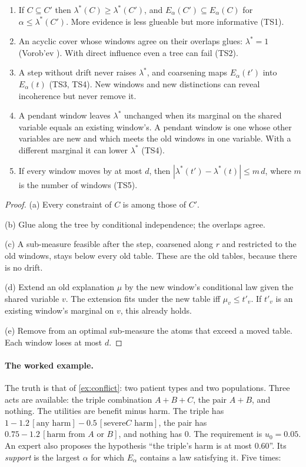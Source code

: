 \documentclass[11pt]{article}
\theoremstyle{definition}\newtheorem{definition}[theorem]{Definition}\newtheorem{remark}[theorem]{Remark}\newtheorem{example}[theorem]{Example}
\begin{document}
\begin{proposition}\label{prop:timesheaf}
\begin{enumerate}
\item[(a)] If $C\subseteq C'$ then $\lambda^*(C)\ge\lambda^*(C')$, and $E_\alpha(C')\subseteq E_\alpha(C)$ for $\alpha\le\lambda^*(C')$. More
  evidence is less glueable but more informative (TS1).
\item[(b)] An acyclic cover whose windows agree on their overlaps glues: $\lambda^*=1$ (Vorob'ev \cite{Vorobev1962}). With direct
  influence even a tree can fail (TS2).
\item[(c)] A step without drift never raises $\lambda^*$, and coarsening maps $E_\alpha(t')$ into $E_\alpha(t)$ (TS3, TS4). New windows and
  new distinctions can reveal incoherence but never remove it.
\item[(d)] A pendant window leaves $\lambda^*$ unchanged when its marginal on the shared variable equals an existing window's. A pendant
  window is one whose other variables are new and which meets the old windows in one variable. With a different marginal it can lower
  $\lambda^*$ (TS4).
\item[(e)] If every window moves by at most $d$, then $|\lambda^*(t')-\lambda^*(t)|\le m\,d$, where $m$ is the number of windows (TS5).
\end{enumerate}
\end{proposition}

\begin{proof}
(a) Every constraint of $C$ is among those of $C'$.

(b) Glue along the tree by conditional independence; the overlaps agree.

(c) A sub-measure feasible after the step, coarsened along $r$ and restricted to the old windows, stays below every old table. These are
the old tables, because there is no drift.

(d) Extend an old explanation $\mu$ by the new window's conditional law given the shared variable $v$. The extension fits under the new
table iff $\mu_v\le t'_v$. If $t'_v$ is an existing window's marginal on $v$, this already holds.

(e) Remove from an optimal sub-measure the atoms that exceed a moved table. Each window loses at most $d$.
\end{proof}

\paragraph{The worked example.}
The truth is that of \cref{ex:conflict}: two patient types and two populations. Three acts are available: the triple combination
$A{+}B{+}C$, the pair $A{+}B$, and nothing. The utilities are benefit minus harm. The triple has $1-1.2\,[\text{any harm}]-0.5\,[\text{severe
$C$ harm}]$, the pair has $0.75-1.2\,[\text{harm from $A$ or $B$}]$, and nothing has $0$. The requirement is $u_0=0.05$. An expert also
proposes the hypothesis ``the triple's harm is at most $0.60$''. Its \emph{support} is the largest $\alpha$ for which $E_\alpha$ contains a
law satisfying it. Five times:
\end{document}
